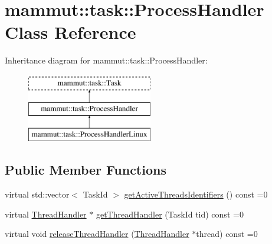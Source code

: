 \hypertarget{classmammut_1_1task_1_1ProcessHandler}{\section{mammut\-:\-:task\-:\-:Process\-Handler Class Reference}
\label{classmammut_1_1task_1_1ProcessHandler}
}
Inheritance diagram for mammut\-:\-:task\-:\-:Process\-Handler\-:\begin{figure}[H]
\begin{center}
\leavevmode
\includegraphics[height=3.000000cm]{classmammut_1_1task_1_1ProcessHandler}
\end{center}
\end{figure}
\subsection*{Public Member Functions}
\begin{DoxyCompactItemize}
\item 
virtual std\-::vector$<$ Task\-Id $>$ \hyperlink{classmammut_1_1task_1_1ProcessHandler_a210393636fbfa4658e80978b2c0d8556}{get\-Active\-Threads\-Identifiers} () const =0
\item 
virtual \hyperlink{classmammut_1_1task_1_1ThreadHandler}{Thread\-Handler} $\ast$ \hyperlink{classmammut_1_1task_1_1ProcessHandler_acdf10305751075accee3fb846469a2f6}{get\-Thread\-Handler} (Task\-Id tid) const =0
\item 
virtual void \hyperlink{classmammut_1_1task_1_1ProcessHandler_aad1791569e9f48ef5559ceeb897e7a1a}{release\-Thread\-Handler} (\hyperlink{classmammut_1_1task_1_1ThreadHandler}{Thread\-Handler} $\ast$thread) const =0
\end{DoxyCompactItemize}


